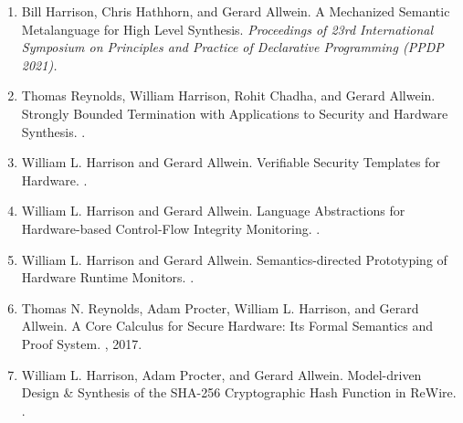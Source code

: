 \documentclass[12pt]{article} %
\begin{document}
\begin{enumerate}[leftmargin=0.0mm]

\item Bill Harrison, Chris Hathhorn, and Gerard Allwein.
\newblock A Mechanized Semantic Metalanguage for High Level Synthesis.  
\newblock \emph{Proceedings of 23rd International Symposium on Principles and Practice of Declarative Programming (PPDP 2021).}


\item
Thomas Reynolds, William Harrison, Rohit Chadha, and Gerard Allwein.
\newblock Strongly Bounded Termination with Applications to Security and Hardware Synthesis.
.

\item 
William L. Harrison and Gerard Allwein.
\newblock Verifiable Security Templates for Hardware.
. 

\item 
William L. Harrison and Gerard Allwein.
\newblock Language Abstractions for Hardware-based Control-Flow Integrity Monitoring.
.

\item 
William L. Harrison and Gerard Allwein.
\newblock Semantics-directed Prototyping of Hardware Runtime Monitors.
.

\item 
Thomas N. Reynolds, Adam Procter, William L. Harrison, and Gerard Allwein.
\newblock A Core Calculus for Secure Hardware: Its Formal Semantics and Proof System.
, 2017.


\item
William L. Harrison, Adam Procter, and Gerard Allwein.
\newblock Model-driven Design \& Synthesis of the SHA-256 Cryptographic Hash Function in ReWire.
.



\end{enumerate}
\end{document}
